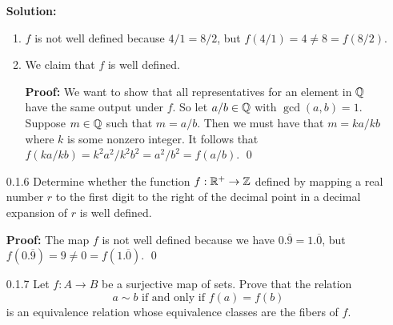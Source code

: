 \begin{enumerate}
      \textbf{Solution:}
         \begin{enumerate}
            \item $f$ is not well defined because $4/1 = 8/2$, but
                  $f(4/1) = 4 \neq 8 = f(8/2)$.
            \item We claim that $f$ is well defined.

                  \textbf{Proof:} We want to show that all representatives for 
                  an element in $\mathbb{Q}$ have the same output under $f$. So let
                  $a/b \in \mathbb{Q}$ with $\gcd(a, b) = 1$. Suppose $m \in \mathbb{Q}$ such 
                  that $m = a/b$. Then we must have that $m = ka/kb$ where $k$ 
                  is some nonzero integer. It follows that
                  $f(ka/kb) = k^2a^2/k^2b^2 = a^2/b^2 = f(a/b)$. \qed
         \end{enumerate}
   \item[0.1.6] Determine whether the function $f: \mathbb{R}^+ \rightarrow \mathbb{Z}$ defined
                by mapping a real number $r$ to the first digit to the right of
                the decimal point in a decimal expansion of $r$ is well defined.

      \textbf{Proof:} The map $f$ is not well defined because we have
      $0.\overline{9} = 1.\overline{0}$, but
      $f(0.\overline{9}) = 9 \neq 0 = f(1.\overline{0})$. \qed
   \item[0.1.7] Let $f : A \rightarrow B$ be a surjective map of sets. Prove
                that the relation
                $$a \sim b \mbox{ if and only if } f(a) = f(b)$$
                is an equivalence relation whose equivalence classes are the
                fibers of $f$.


\end{enumerate}
